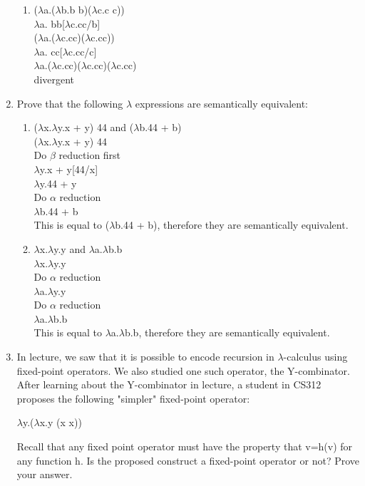 \documentclass[11pt]{article}
\begin{document}
\begin{enumerate}
\begin{enumerate}
\item ($\lambda$a.($\lambda$b.b b)($\lambda$c.c c)) \hspace{12pt} \\
$\lambda$a. bb[$\lambda$c.cc/b]\\
($\lambda$a.($\lambda$c.cc)($\lambda$c.cc))\\
$\lambda$a.  cc[$\lambda$c.cc/c]\\
$\lambda$a.($\lambda$c.cc)($\lambda$c.cc)($\lambda$c.cc)\\
divergent

\end{enumerate}

\item Prove that the following $\lambda$ expressions are semantically equivalent:
\begin{enumerate}
\item ($\lambda$x.$\lambda$y.x + y) 44 and ($\lambda$b.44 + b)\hspace{12pt}\\

($\lambda$x.$\lambda$y.x + y) 44\\
Do $\beta$ reduction first\\
$\lambda$y.x + y[44/x]\\
$\lambda$y.44 + y\\
Do $\alpha$ reduction\\
$\lambda$b.44 + b\\
This is equal to ($\lambda$b.44 + b), therefore they are semantically equivalent.

\item $\lambda$x.$\lambda$y.y and $\lambda$a.$\lambda$b.b\hspace{12pt}\\

$\lambda$x.$\lambda$y.y\\
Do $\alpha$ reduction\\
$\lambda$a.$\lambda$y.y\\
Do $\alpha$ reduction\\
$\lambda$a.$\lambda$b.b\\
This is equal to $\lambda$a.$\lambda$b.b, therefore they are semantically equivalent.
\end{enumerate}


\item In lecture, we saw that it is possible to encode recursion in $\lambda$-calculus using fixed-point operators. We also studied one such operator, the Y-combinator.\\
After learning about the Y-combinator in lecture, a student in CS312 proposes the following "simpler" fixed-point operator:\\
\begin{center}
$\lambda$y.($\lambda$x.y (x x))\\
\end{center}
Recall that any fixed point operator must have the property that v=h(v) for any function h. Is the proposed construct a fixed-point operator or not? Prove your answer.\\


\end{enumerate}
\end{document}
